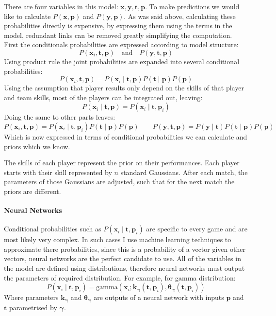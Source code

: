 \documentclass[12pt,a4paper]{book}
\newcommand\bs[1]{\boldsymbol{#1}}
\begin{document}
There are four variables in this model: $\bs{x},\bs{y},\bs{t},\bs{p}$.
To make predictions we would like to calculate $P(\bs{x},\bs{p})$ and $P(\bs{y},\bs{p})$.
As was said above, calculating these probabilities directly is expensive, by expressing them using the terms in the model, redundant links can be removed greatly simplifying the computation.
First the conditionals probabilities are expressed according to model structure:
\begin{equation*}
P(\bs{x}_i,\bs{t},\bs{p})\quad \text{and} \quad P(\bs{y},\bs{t},\bs{p})
\end{equation*}
Using product rule the joint probabilities are expanded into several conditional probabilities:
\begin{equation*}
P(\bs{x}_i,\bs{t},\bs{p}) = P(\bs{x}_i\mid\bs{t},\bs{p})P(\bs{t}\mid\bs{p})P(\bs{p})
\end{equation*}
Using the assumption that player results only depend on the skills of that player and team skills, most of the players can be integrated out, leaving:
\begin{equation*}
P(\bs{x}_i\mid\bs{t},\bs{p}) = P(\bs{x}_i\mid\bs{t},\bs{p}_i)
\end{equation*}
Doing the same to other parts leaves:
\begin{equation}
P(\bs{x}_i,\bs{t},\bs{p}) = P(\bs{x}_i\mid\bs{t},\bs{p}_i)P(\bs{t}\mid\bs{p})P(\bs{p})\qquad
P(\bs{y},\bs{t},\bs{p}) = P(\bs{y}\mid\bs{t})P(\bs{t}\mid\bs{p})P(\bs{p})
\label{eq:split-conditionals}
\end{equation}
Which is now expressed in terms of conditional probabilities we can calculate and priors which we know.

The skills of each player represent the prior on their performances.
Each player starts with their skill represented by $n$ standard Gaussians.
After each match, the parameters of those Gaussians are adjusted, such that for the next match the priors are different.

\paragraph{Neural Networks}
Conditional probabilities such as $P(\bs{x}_i\mid\bs{t},\bs{p}_i)$ are specific to every game and are most likely very complex.
In such cases I use machine learning techniques to approximate there probabilities, since this is a probability of a vector given other vectors, neural networks are the perfect candidate to use.
All of the variables in the model are defined using distributions, therefore neural networks must output the parameters of required distribution.
For example, for gamma distribution:
\begin{equation*}
P(\bs{x}_i \mid\bs{t},\bs{p}_i)=\text{gamma}(\bs{x}_i;\bs{k_\gamma}(\bs{t},\bs{p}_i), \bs{\theta_\gamma}(\bs{t},\bs{p}_i))
\end{equation*}
Where parameters $\bs{k_\gamma}$ and $\bs{\theta_\gamma}$ are outputs of a neural network with inputs $\bs{p}$ and $\bs{t}$ parametrised by $\bs{\gamma}$.
\end{document}
